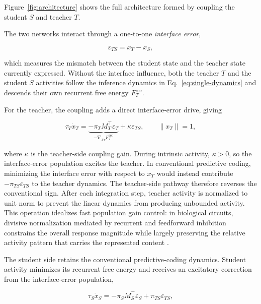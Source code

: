 \documentclass[10pt,letterpaper]{article}
\theoremstyle{plain}
\theoremstyle{remark}
\begin{document}
Figure~\ref{fig:architecture} shows the full architecture formed by coupling the student $S$ and teacher $T$.

The two networks interact through a one-to-one \emph{interface error},

\begin{equation}
\varepsilon_{TS}=x_T-x_S,
\label{eq:interface-error}
\end{equation}

which measures the mismatch between the student state and the teacher state currently expressed. Without the interface influence, both the teacher $T$ and the student $S$ activities follow the inference dynamics in Eq.~\eqref{eq:single-dynamics} and descends their own recurrent free energy $F_T^{\mathrm{rec}}$.

For the teacher, the coupling adds a direct interface-error drive, giving

\begin{equation}
\tau_T \dot{x}_T
=
\underbrace{-\pi_T M_T^\top \varepsilon_T}
_{-\nabla_{x_T}F_T^{\mathrm{rec}}}
+\kappa\varepsilon_{TS},
\qquad
\lVert x_T\rVert=1,
\label{eq:teacher-coupled-dynamics}
\end{equation}

where $\kappa$ is the teacher-side coupling gain. During intrinsic activity, $\kappa>0$, so the interface-error population excites the teacher. In conventional predictive coding, minimizing the interface error with respect to $x_T$ would instead contribute $-\pi_{TS}\varepsilon_{TS}$ to the teacher dynamics. The teacher-side pathway therefore reverses the conventional sign. After each integration step, teacher activity is normalized to unit norm to prevent the linear dynamics from producing unbounded activity. This operation idealizes fast population gain control: in biological circuits, divisive normalization mediated by recurrent and feedforward inhibition constrains the overall response magnitude while largely preserving the relative activity pattern that carries the represented content \cite{REF}.


The student side retains the conventional predictive-coding dynamics. Student activity minimizes its recurrent free energy and receives an excitatory correction from the interface-error population,

\begin{equation}
\tau_S\dot x_S
=
-\pi_SM_S^\top\varepsilon_S
+\pi_{TS}\varepsilon_{TS},
\label{eq:student-coupled-dynamics}
\end{equation}
\end{document}
